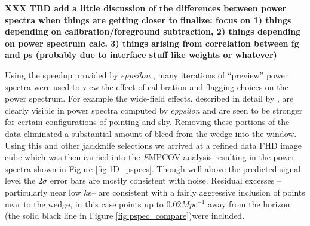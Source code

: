 \documentclass[preprint]{aastex}
\def\eppsilon{{\it $\epsilon$ppsilon }}
\def\implicitcov{{\emph EMPCOV }}
\begin{document}
{\bf XXX TBD add a little discussion of the differences between power spectra when things are getting closer to finalize: focus on 1) things depending on calibration/foreground subtraction, 2) things depending on power spectrum calc.  3) things arising from correlation between fg and ps (probably due to interface stuff like weights or whatever)}


Using the speedup provided by \eppsilon, many iterations of ``preview'' power spectra were used to view the effect of calibration and flagging choices on the power spectrum. For example the wide-field effects, described in detail by \cite{2015arXiv150207596T}, are clearly visible in power spectra computed by \eppsilon and are seen to be stronger for certain configurations of pointing and sky. Removing these portions of the data eliminated a substantial amount of bleed from the wedge into the window.  Using this and other jackknife selections we arrived at a refined data FHD image cube which was then carried into the \implicitcov analysis resulting in the power spectra shown in Figure \ref{fig:1D_pspecs}.   Though well above the predicted signal level the 2$\sigma$ error bars are mostly consistent with noise.   Residual excesses --particularly near low $k$s--  are consistent with a fairly aggressive inclusion of points near to the wedge, in this case points up to 0.02$Mpc^{-1}$ away from the horizon (the solid black line in Figure \ref{fig:pspec_compare})were included.
\end{document}

